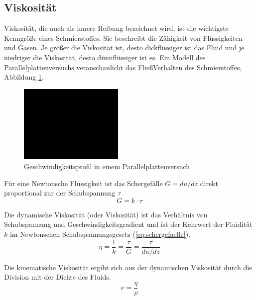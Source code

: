 \subsection*{Viskosität}
\label{sub:viskositaet}
Viskosität, die auch als innere Reibung bezeichnet wird, ist die wichtigste Kenngröße eines Schmierstoffes.
Sie beschreibt die Zähigkeit von Flüssigkeiten und Gasen.
Je größer die Viskosität ist, desto dickflüssiger ist das Fluid und je niedriger die Viskosität, desto dünnflüssiger ist es.
Ein Modell des Parallelplattenversuchs veranschaulicht das FließVerhalten des Schmierstoffes, Abbildung \ref{fig:geschwindigkeitsprofil_parallelplattenversuch}.
\begin{figure}[htb]
    \centering
    \includegraphics[width=5cm]{./images/blank_img.jpg}
    \caption{Geschwindigkeitsprofil in einem Parallelplattenversuch}
    \label{fig:geschwindigkeitsprofil_parallelplattenversuch}
\end{figure}

Für eine Newtonsche Flüssigkeit ist das Schergefälle $G = du/dz$ direkt proportional zur der Schubspannung $\tau$
\begin{equation}
    G = k \cdot \tau
    \label{eq:schergefaelle}
\end{equation}

Die dynamische Viskosität (oder Viskosität) ist das Verhältnis von Schubspannung und Geschwindigkeitsgradient und ist der Kehrwert der Fluidität $k$ im Newtonschen Schubspannungsgesetz (\ref{eq:schergefaelle}).
\begin{equation}
    \eta = \frac{1}{k} = \frac{\tau}{G} = \frac{\tau}{du/dz}
    \label{eq:dynamische_viskositaet}
\end{equation}

Die kinematische Viskosität ergibt sich aus der dynamischen Viskosität durch die Division mit der Dichte des Fluids.
\begin{equation}
    \nu = \frac{\eta}{\rho}
    \label{eq:kinematische_viskotitaet}
\end{equation}

